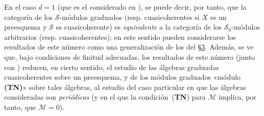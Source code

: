 \documentclass[oneside,10pt]{amsart}
\begin{document}
\begin{remark}[8.14.12]
En el caso $d=1$ (que es el considerado en ), se puede decir, por tanto, que la categoría de los $\mathcal{S}$-módulos graduados (resp. cuasicoherentes si $X$ es un preesquema y $\mathcal{S}$ es cuasicoherente) es \emph{equivalente} a la categoría de los $\mathcal{S}_0$-módulos arbitrarios (resp. cuasicoherentes);
en este sentido pueden considerarse los resultados de este número como una generalización de los del §\hyperref[section:II.3-fr]{3}.
Además, se ve que, bajo condiciones de finitud adecuadas, los resultados de este número (junto con ) reducen, en cierto sentido, el estudio de las álgebras graduadas cuasicoherentes sobre un preesquema, y de los módulos graduados «módulo \textbf{(TN)}» sobre tales álgebras, al estudio del caso particular en que las álgebras consideradas son \emph{periódicas} (y en el que la condición~(\textbf{TN}) para $\mathcal{M}$  implica, por tanto, que $\mathcal{M}=0$).
\end{remark}
\end{document}
